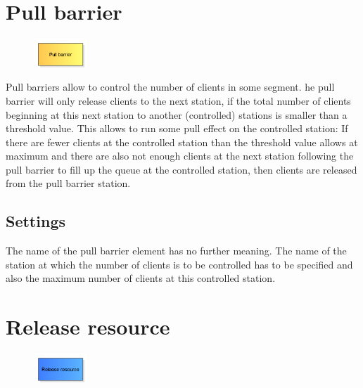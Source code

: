 \section{Pull barrier}
\label{ref:ModelElementBarrierPull}

\begin{figure}
\vspace{-22pt}
\includegraphics[width=2cm]{imageModelElementBarrierPull.png}
\vspace{-22pt}
\end{figure}

Pull barriers allow to control the number of clients in some segment.
he pull barrier will only release clients to the next station, if
the total number of clients beginning at this next station to another
(controlled) stations is smaller than a threshold value. This allows to
run some pull effect on the controlled station: If there are
fewer clients at the controlled station than the threshold value allows
at maximum and there are also not enough clients at the next station
following the pull barrier to fill up the queue at the controlled station,
then clients are released from the pull barrier station.

\subsection*{Settings}

The name of the pull barrier element has no further meaning. The name of
the station at which the number of clients is to be controlled has
to be specified and also the maximum number of clients at this controlled
station.


\section{Release resource}
\label{ref:ModelElementRelease}

\begin{figure}
\vspace{-22pt}
\includegraphics[width=2cm]{imageModelElementRelease.png}
\vspace{-22pt}
\end{figure}

